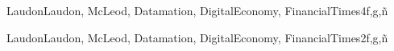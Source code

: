 \begin{syllabus}
\begin{unit}{\SPPrivacyandCivilLiberties}{}{LaudonLaudon, McLeod, Datamation, DigitalEconomy, FinancialTimes}{4}{f,g,ñ}
	\begin{learningoutcomes}%
        \item \SPPrivacyandCivilLibertiesLODiscussTheFor [\Familiarity]
        \item \SPPrivacyandCivilLibertiesLOEvaluateSolutions [\Familiarity]
        \item \SPPrivacyandCivilLibertiesLODescribeTheDataThe [\Familiarity]
        \item \SPPrivacyandCivilLibertiesLODescribeTheDifferential [\Familiarity]
        \item \SPPrivacyandCivilLibertiesLOInvestigateTheTechnological [\Familiarity]
        \item \SPPrivacyandCivilLibertiesLOCritiqueThe [\Familiarity]
        \item \SPPrivacyandCivilLibertiesLOIdentifyStrategies [\Familiarity]
	\end{learningoutcomes}
\end{unit}

\begin{unit}{\SPSecurityPoliciesLawsandComputerCrimes}{}{LaudonLaudon, McLeod, Datamation, DigitalEconomy, FinancialTimes}{2}{f,g,ñ}
	\begin{topics}
        \item \SPSecurityPoliciesLawsandComputerCrimesTopicExamples
        \item \SPSecurityPoliciesLawsandComputerCrimesTopicSocial
        \item \SPSecurityPoliciesLawsandComputerCrimesTopicIssues
        \item \SPSecurityPoliciesLawsandComputerCrimesTopicMotivations
        \item \SPSecurityPoliciesLawsandComputerCrimesTopicEffects
        \item \SPSecurityPoliciesLawsandComputerCrimesTopicCrime
        \item \SPSecurityPoliciesLawsandComputerCrimesTopicSecurity
	\end{topics}


\end{unit}
\end{syllabus}
